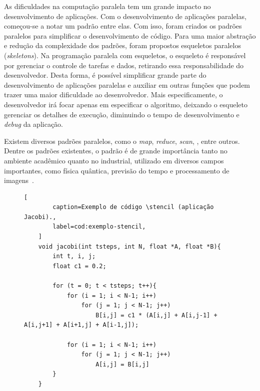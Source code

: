As dificuldades na computação paralela tem um grande impacto no desenvolvimento de aplicações. Com o
desenvolvimento de aplicações paralelas, começou-se a notar um padrão entre
elas. Com isso, foram criados os padrões paralelos para simplificar o
desenvolvimento de código.
Para uma maior abstração e redução da complexidade dos padrões, foram propostos
esqueletos paralelos (\textit{skeletons}). Na programação paralela com esqueletos, o esqueleto é responsável por
gerenciar o controle de tarefas e dados, retirando essa responsabilidade do
desenvolvedor. Desta forma, é possível simplificar grande parte do
desenvolvimento de aplicações paralelas e auxiliar em outras funções que podem
trazer uma maior dificuldade ao desenvolvedor. Mais especificamente, o
desenvolvedor irá focar apenas em especificar o algoritmo, deixando o esqueleto
gerenciar os detalhes de execução, diminuindo o tempo de desenvolvimento e
\textit{debug} da aplicação.

Existem diversos padrões paralelos, como o \textit{map}, \textit{reduce},
\textit{scan}, \stencil, entre outros. Dentre os padrões existentes, o
padrão \stencil é de grande importância tanto no ambiente acadêmico quanto no
industrial, utilizado em diversos campos importantes, como física quântica,
previsão do tempo e processamento de imagens~\cite{pereira15}.

\begin{figure}[t]
	\begin{lstlisting}[
		caption=Exemplo de código \stencil (aplicação Jacobi).,
		label=cod:exemplo-stencil,
	]
	void jacobi(int tsteps, int N, float *A, float *B){
		int t, i, j;
		float c1 = 0.2;

		for (t = 0; t < tsteps; t++){
			for (i = 1; i < N-1; i++)
				for (j = 1; j < N-1; j++)
					B[i,j] = c1 * (A[i,j] + A[i,j-1] + A[i,j+1] + A[i+1,j] + A[i-1,j]);

			for (i = 1; i < N-1; i++)
				for (j = 1; j < N-1; j++)
					A[i,j] = B[i,j]
		}
	}
\end{lstlisting}
\end{figure}

